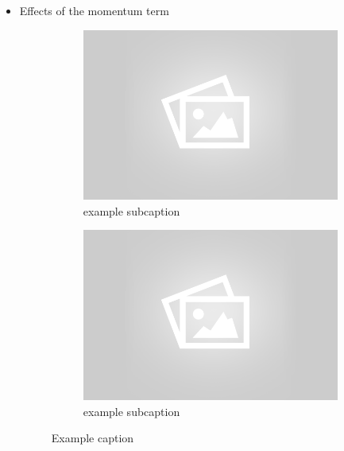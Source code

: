 \begin{itemize}
	\item Effects of the momentum term	
		\begin{figure}[!ht]
		\centering
		\begin{subfigure}[b]{.45\textwidth}
		\centering
		\includegraphics[width=\textwidth]{mlp/placeholder.png}
		\caption{example subcaption}
		\end{subfigure}
		\quad
		\begin{subfigure}[b]{.45\textwidth}
		\centering
		\includegraphics[width=\textwidth]{mlp/placeholder.png}
		\caption{example subcaption}
		\label{fig:subfigure2}
		\end{subfigure}
		\caption{Example caption}
		\label{fig:example}
		\end{figure}

\end{itemize}

